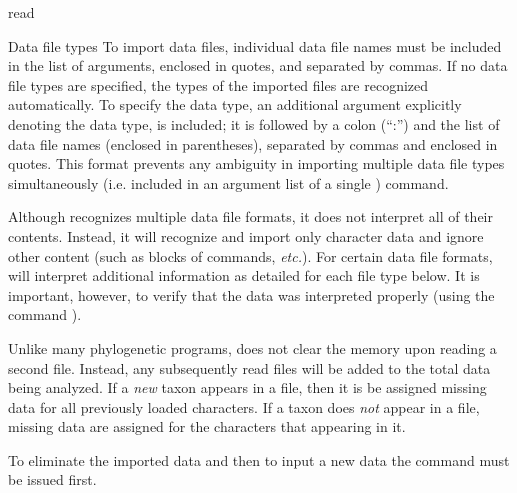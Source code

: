 \begin{command}{read}{}
\begin{arguments}
        \begin{argumentgroup}{Data file types}
            To import data files, individual data file names must be included in
            the list of  arguments, enclosed in quotes, and
            separated by commas. If no data file types are specified, the types
            of the imported files are recognized automatically. To specify the
            data type, an additional argument explicitly denoting the data type,
            is included; it is followed by a colon (``:'') and the list of data
            file names (enclosed in parentheses), separated by commas and
            enclosed in quotes. This format prevents any ambiguity in importing
            multiple data file types simultaneously (i.e. included in an
            argument list of a single ) command.

        \end{argumentgroup}
    
        \begin{statement}
            Although \poy recognizes multiple data file formats, it does not
            interpret all of their contents. Instead, it will recognize and import
            only character data and ignore other content (such as blocks of
            commands, \emph{etc.}). For certain data file formats, \poy will interpret
            additional information as detailed for each file type below.
            It is important, however, to verify that the data was interpreted properly (using
            the command ).
        \end{statement}
            
        \begin{statement}
            Unlike many phylogenetic programs, \poy does not clear the memory
            upon reading a second file. Instead, any subsequently read files
            will be added to the total data being analyzed.  If a \emph{new} taxon
            appears in a file, then it is be assigned missing data for all
            previously loaded characters. If a taxon does \emph{not} appear in a
            file, missing data are assigned for the characters that appearing in it. 

            \indent To eliminate the imported data and then to input a new data
            the  command must be issued first. 
        \end{statement}
        

\end{arguments}
\end{command}
